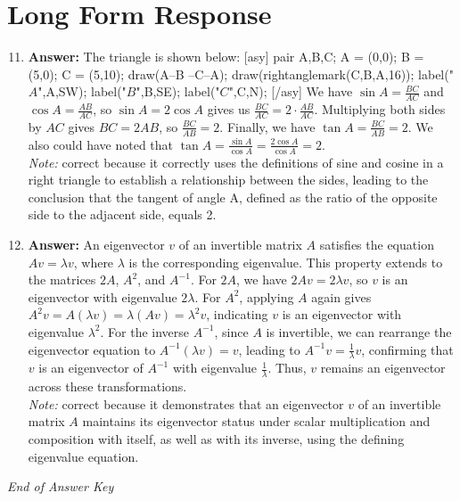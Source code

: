 \documentclass[12pt]{article}
\begin{document}
\section*{Long Form Response}
\begin{enumerate}[label=\arabic*.]
\setcounter{enumi}{10}
\item \textbf{Answer:} The triangle is shown below: [asy] pair A,B,C; A = (0,0); B = (5,0); C = (5,10); draw(A--B --C--A); draw(rightanglemark(C,B,A,16)); label("$A$",A,SW); label("$B$",B,SE); label("$C$",C,N); [/asy] We have $\sin A = \frac{BC}{AC}$ and $\cos A = \frac{AB}{AC}$, so $\sin A = 2\cos A$ gives us $\frac{BC}{AC} = 2\cdot\frac{AB}{AC}$. Multiplying both sides by $AC$ gives $BC = 2 AB$, so $\frac{BC}{AB} = 2$. Finally, we have $\tan A = \frac{BC}{AB} = \boxed{2}$. We also could have noted that $\tan A = \frac{\sin A}{\cos A} = \frac{2\cos A}{\cos A } =\boxed{2}$.
\\ \textit{Note:} correct because it correctly uses the definitions of sine and cosine in a right triangle to establish a relationship between the sides, leading to the conclusion that the tangent of angle A, defined as the ratio of the opposite side to the adjacent side, equals 2.
\item \textbf{Answer:} An eigenvector \( v \) of an invertible matrix \( A \) satisfies the equation \( A v = \lambda v \), where \( \lambda \) is the corresponding eigenvalue. This property extends to the matrices \( 2 A \), \( A^2 \), and \( A^{-1} \). For \( 2 A \), we have \( 2 Av = 2\lambda v \), so \( v \) is an eigenvector with eigenvalue \( 2\lambda \). For \( A^2 \), applying \( A \) again gives \( A^2 v = A(\lambda v) = \lambda(Av) = \lambda^2 v \), indicating \( v \) is an eigenvector with eigenvalue \( \lambda^2 \). For the inverse \( A^{-1} \), since \( A \) is invertible, we can rearrange the eigenvector equation to \( A^{-1}(\lambda v) = v \), leading to \( A^{-1}v = \frac{1}{\lambda}v \), confirming that \( v \) is an eigenvector of \( A^{-1} \) with eigenvalue \( \frac{1}{\lambda} \). Thus, \( v \) remains an eigenvector across these transformations.
\\ \textit{Note:} correct because it demonstrates that an eigenvector \( v \) of an invertible matrix \( A \) maintains its eigenvector status under scalar multiplication and composition with itself, as well as with its inverse, using the defining eigenvalue equation.
\end{enumerate}

\vfill
\noindent\textit{End of Answer Key}
\end{document}
